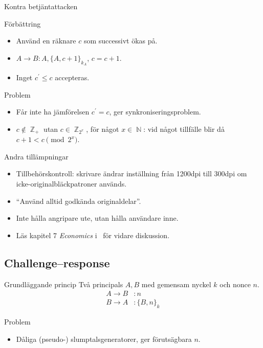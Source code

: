 \documentclass{beamer}
\theoremstyle{definition}
\theoremstyle{remark}
\DeclareMathOperator{\N}{\mathbb{N}}
\DeclareMathOperator{\Z}{\mathbb{Z}}
\newcommand{\encrypt}[2]{\{#1\}_{#2}}
\begin{document}
\begin{frame}{\insertsubsectionhead}{Kontra betjäntattacken}
  \begin{block}{Förbättring}
    \begin{itemize}
      \item Använd en räknare \(c\) som successivt ökas på.
      \item \(A\to B\colon A, \encrypt{A, c+1}{k_A}\), \(c = c+1\).
      \item Inget \(c^\prime \leq c\) accepteras.
    \end{itemize}
  \end{block}
  \begin{block}{Problem}
    \begin{itemize}
      \item Får inte ha jämförelsen \(c^\prime = c\), ger 
        synkroniseringsproblem.
      \item \(c\notin \Z_+\) utan \(c\in \Z_{2^x}\), för något \(x\in \N\): vid 
        något tillfälle blir då \(c+1 < c \pmod{2^x}\).
    \end{itemize}
  \end{block}
\end{frame}

\begin{frame}{\insertsubsectionhead}{Andra tillämpningar}
  \begin{itemize}
    \item Tillbehörskontroll: skrivare ändrar inställning från \unit{1200}{dpi} 
      till \unit{300}{dpi} om icke-originalbläckpatroner används.
    \item \enquote{Använd alltid godkända originaldelar}.
    \item Inte hålla angripare ute, utan hålla användare inne.
    \item Läs kapitel 7 \emph{Economics} i~\cite{Anderson2008sea} för vidare 
      diskussion.
  \end{itemize}
\end{frame}

\subsection{Challenge--response}

\begin{frame}{\insertsubsectionhead}
  \begin{block}{Grundläggande princip}
    Två principals \(A, B\) med gemensam nyckel \(k\) och nonce \(n\).
    \begin{align*}
      A\to B &\colon n \\
      B\to A &\colon \encrypt{B, n}{k}
    \end{align*}
  \end{block}
  \begin{block}{Problem}
    \begin{itemize}
      \item Dåliga (pseudo-) slumptalsgeneratorer, ger förutsägbara \(n\).
    \end{itemize}
  \end{block}
\end{frame}
\end{document}
